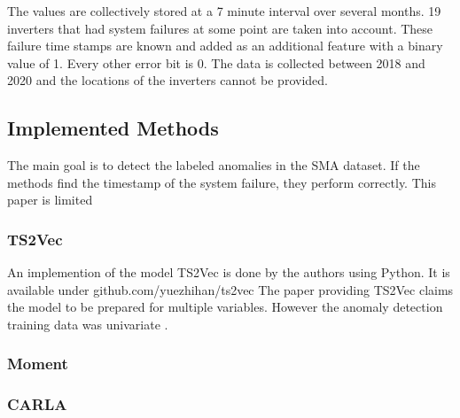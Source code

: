The values are collectively stored at a 7 minute interval over several months. 19 inverters that had system failures at some point are taken into account. These failure time stamps are known and added as an additional feature with a binary value of 1. Every other error bit is 0. The data is collected between 2018 and 2020 and the locations of the inverters cannot be provided.


\subsection{Implemented Methods}
The main goal is to detect the labeled anomalies in the SMA dataset. If the methods find the timestamp of the system failure, they perform correctly. This paper is limited
%

\subsubsection{TS2Vec}
An implemention of the model TS2Vec is done by the authors using Python. It is available under github.com/yuezhihan/ts2vec
The paper providing TS2Vec claims the model to be prepared for multiple variables. However the anomaly detection training data was univariate .

\subsubsection{Moment}

\subsubsection{CARLA}

